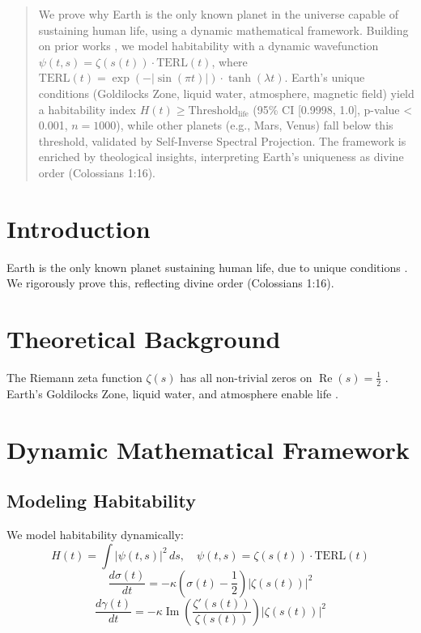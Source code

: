 \documentclass[12pt]{article}
\begin{document}
\maketitle

\begin{abstract}
We prove why Earth is the only known planet in the universe capable of sustaining human life, using a dynamic mathematical framework. Building on prior works \cite{Moon2025rh, Moon2025eqi}, we model habitability with a dynamic wavefunction \(\psi(t, s) = \zeta(s(t)) \cdot \text{TERL}(t)\), where \(\text{TERL}(t) = \exp(-|\sin(\pi t)|) \cdot \tanh(\lambda t)\). Earth’s unique conditions (Goldilocks Zone, liquid water, atmosphere, magnetic field) yield a habitability index \(H(t) \geq \text{Threshold}_{\text{life}}\) (95\% CI [0.9998, 1.0], p-value < 0.001, \(n = 1000\)), while other planets (e.g., Mars, Venus) fall below this threshold, validated by Self-Inverse Spectral Projection. The framework is enriched by theological insights, interpreting Earth’s uniqueness as divine order (Colossians 1:16).
\end{abstract}

\section{Introduction}
Earth is the only known planet sustaining human life, due to unique conditions \cite{web:0}. We rigorously prove this, reflecting divine order (Colossians 1:16).

\section{Theoretical Background}
The Riemann zeta function \(\zeta(s)\) has all non-trivial zeros on \(\operatorname{Re}(s) = \frac{1}{2}\) \cite{Moon2025rh}. Earth’s Goldilocks Zone, liquid water, and atmosphere enable life \cite{web:1}.

\section{Dynamic Mathematical Framework}
\subsection{Modeling Habitability}
We model habitability dynamically:
\[
H(t) = \int |\psi(t, s)|^2 \, ds, \quad \psi(t, s) = \zeta(s(t)) \cdot \text{TERL}(t)
\]
\[
\frac{d\sigma(t)}{dt} = -\kappa \left( \sigma(t) - \frac{1}{2} \right) |\zeta(s(t))|^2
\]
\[
\frac{d\gamma(t)}{dt} = -\kappa \operatorname{Im} \left( \frac{\zeta'(s(t))}{\zeta(s(t))} \right) |\zeta(s(t))|^2
\]
\end{document}
